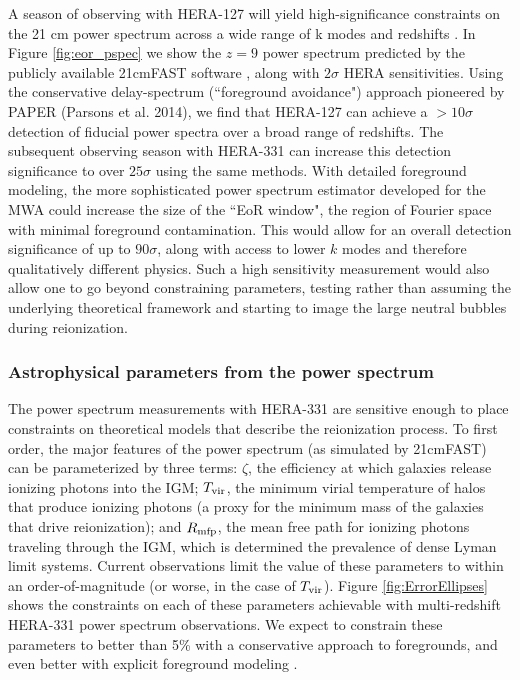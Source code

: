 \documentclass[preprint]{aastex}
\begin{document}
A season of observing with HERA-127 will yield high-significance constraints on the 21 cm power 
spectrum across a wide range of k modes and redshifts \citep{pober_et_al2014}.  In Figure \ref{fig:eor_pspec} we show 
the $z=9$ power spectrum predicted by the publicly available 21cmFAST software \citep{mesinger_et_al2011}, 
along with $2\sigma$ HERA sensitivities.  Using the conservative delay-spectrum (``foreground avoidance") 
approach pioneered by PAPER (Parsons et al. 2014), we find that HERA-127 can achieve a $> 10\sigma$ detection 
of fiducial power spectra over a broad range of redshifts.  The subsequent observing season with HERA-331 can 
increase this detection significance to over $25\sigma$ using the same methods.  With detailed foreground 
modeling, the more sophisticated power spectrum estimator developed for the MWA could increase the size of the 
``EoR window", the region of Fourier space with minimal foreground contamination. This would allow for an overall 
detection significance of up to $90\sigma$, along with access to lower $k$ modes and therefore qualitatively 
different physics.  Such a high sensitivity measurement would also allow one to go beyond constraining parameters, 
testing rather than assuming  the underlying theoretical framework and starting to image the large neutral bubbles during reionization.

\subsubsection{Astrophysical parameters from the power spectrum}
\label{sec:ParamEst}

The power spectrum measurements with HERA-331 are sensitive enough to place constraints on theoretical models that 
describe the reionization process.  To first order, the major features of the power spectrum (as simulated by 
21cmFAST) can be parameterized by three terms: $\zeta$, the efficiency at which galaxies release ionizing photons 
into the IGM; $T_{\rm vir}$, the minimum virial temperature of halos that produce ionizing photons (a proxy for 
the minimum mass of the galaxies that drive reionization); and $R_{\rm mfp}$, the mean free path for ionizing 
photons traveling through the IGM, which is determined the prevalence of dense Lyman limit systems.  Current 
observations limit the value of these parameters to within an order-of-magnitude (or worse, in the case of 
$T_{\rm vir}$).  Figure \ref{fig:ErrorEllipses} shows the constraints on each of these parameters achievable 
with multi-redshift HERA-331 power spectrum observations.  We expect to constrain these parameters to better 
than 5\% with a conservative approach to foregrounds, and even better with explicit foreground modeling \citep{pober_et_al2014}.
\end{document}
